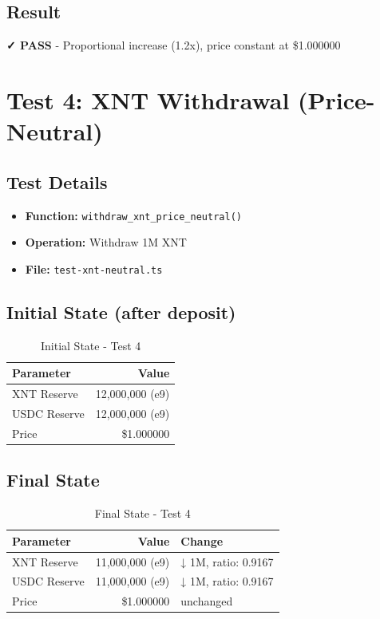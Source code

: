 \documentclass[11pt,a4paper]{article}
\begin{document}
\subsection{Result}
\begin{tcolorbox}[colback=success!10,colframe=success]
\textbf{✓ PASS} - Proportional increase (1.2x), price constant at \$1.000000
\end{tcolorbox}

\newpage

\section{Test 4: XNT Withdrawal (Price-Neutral)}

\subsection{Test Details}
\begin{itemize}
    \item \textbf{Function:} \texttt{withdraw\_xnt\_price\_neutral()}
    \item \textbf{Operation:} Withdraw 1M XNT
    \item \textbf{File:} \texttt{test-xnt-neutral.ts}
\end{itemize}

\subsection{Initial State (after deposit)}
\begin{table}[h]
\centering
\begin{tabular}{lr}
\toprule
\textbf{Parameter} & \textbf{Value} \\
\midrule
XNT Reserve & 12,000,000 (e9) \\
USDC Reserve & 12,000,000 (e9) \\
Price & \$1.000000 \\
\bottomrule
\end{tabular}
\caption{Initial State - Test 4}
\end{table}

\subsection{Final State}
\begin{table}[h]
\centering
\begin{tabular}{lrl}
\toprule
\textbf{Parameter} & \textbf{Value} & \textbf{Change} \\
\midrule
XNT Reserve & 11,000,000 (e9) & ↓ 1M, ratio: 0.9167 \\
USDC Reserve & 11,000,000 (e9) & ↓ 1M, ratio: 0.9167 \\
Price & \$1.000000 & unchanged \\
\bottomrule
\end{tabular}
\caption{Final State - Test 4}
\end{table}
\end{document}
